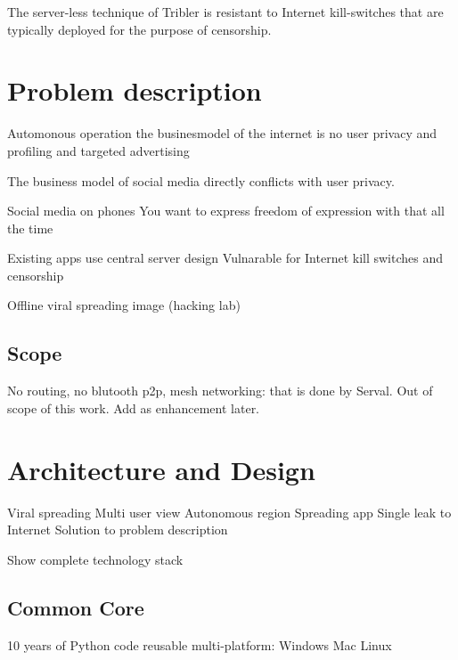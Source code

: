 \documentclass[]{report}
\begin{document}
The server-less technique of Tribler is resistant to Internet kill-switches that are typically deployed for the purpose of censorship.




\chapter{Problem description}



Automonous operation
the businesmodel of the internet is no user privacy and profiling and targeted advertising



The business model of social media directly conflicts with user privacy. %

Social media on phones
You want to express freedom of expression with that all the time

Existing apps use central server design
Vulnarable for Internet kill switches and censorship

Offline viral spreading image (hacking lab)





\section{Scope}
No routing, no blutooth p2p, mesh networking: that is done by Serval. Out of scope of this work. Add as enhancement later.










\chapter{Architecture and Design}

Viral spreading
Multi user view
Autonomous region
Spreading app
Single leak to Internet
Solution to problem description


Show complete technology stack


\section{Common Core}
10 years of Python code 
reusable multi-platform: Windows Mac Linux
\end{document}
